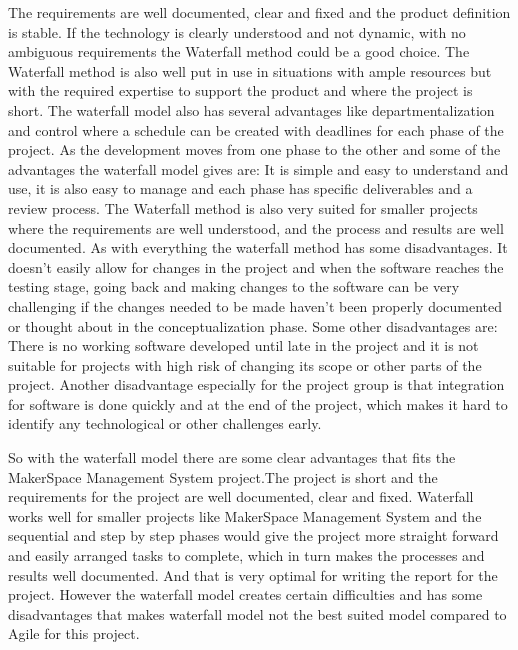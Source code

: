 The requirements are well documented, clear and fixed\cite{SDLC_Waterfall_Model} and the product definition is stable. If the technology is clearly understood and not dynamic, with no ambiguous requirements the Waterfall method could be a good choice. The Waterfall method is also well put in use in situations with ample resources but with the required expertise to support the product and where the project is short. The waterfall model also has several advantages like departmentalization and control where a schedule can be created with deadlines for each phase of the project. As the development moves from one phase to the other and some of the advantages the waterfall model gives are: 
It is simple and easy to understand and use, it is also easy to manage and each phase has specific deliverables and a review process. The Waterfall method is also very suited for smaller projects where the requirements are well understood\cite{Waterfall_Requirement_Advantage}, and the process and results are well documented. 
As with everything the waterfall method has some disadvantages. It doesn't easily allow for changes in the project and when the software reaches the testing stage, going back and making changes to the software can be very challenging if the changes needed to be made haven't been properly documented or thought about in the conceptualization phase\cite{seguetech_waterfall_vs_agile}. Some other disadvantages are: 
There is no working software developed until late in the project and it is not suitable for projects with high risk of changing its scope or other parts of the project\cite{Waterfalls_clear_advantage}. Another disadvantage especially for the project group is that integration for software is done quickly and at the end of the project, which makes it hard to identify any technological or other challenges early\cite{Waterfall_Software_Engineering}. 

So with the waterfall model there are some clear advantages that fits the MakerSpace Management System project.The project is short and the requirements for the project are well documented, clear and fixed. Waterfall works well for smaller projects like MakerSpace Management System and the sequential and step by step phases would give the project more straight forward and easily arranged tasks to complete, which in turn makes the processes and results well documented. And that is very optimal for writing the report for the project. However the waterfall model creates certain difficulties and has some disadvantages that makes waterfall model not the best suited model compared to Agile for this project\cite{seguetech_waterfall_vs_agile}. 

